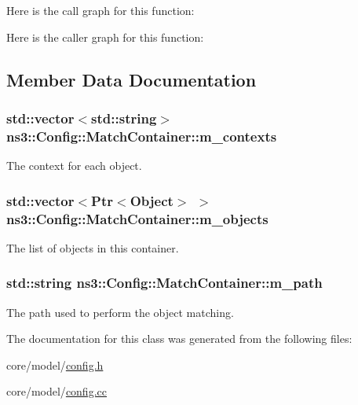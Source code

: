 Here is the call graph for this function\+:




Here is the caller graph for this function\+:




\subsection{Member Data Documentation}
\subsubsection[{\texorpdfstring{m\+\_\+contexts}{m_contexts}}]{\setlength{\rightskip}{0pt plus 5cm}std\+::vector$<$std\+::string$>$ ns3\+::\+Config\+::\+Match\+Container\+::m\+\_\+contexts\hspace{0.3cm}{\ttfamily [private]}}\hypertarget{classns3_1_1Config_1_1MatchContainer_afdcb16d3c587db9e4d6765e41221b3c2}{}\label{classns3_1_1Config_1_1MatchContainer_afdcb16d3c587db9e4d6765e41221b3c2}
The context for each object. 
\subsubsection[{\texorpdfstring{m\+\_\+objects}{m_objects}}]{\setlength{\rightskip}{0pt plus 5cm}std\+::vector$<${\bf Ptr}$<${\bf Object}$>$ $>$ ns3\+::\+Config\+::\+Match\+Container\+::m\+\_\+objects\hspace{0.3cm}{\ttfamily [private]}}\hypertarget{classns3_1_1Config_1_1MatchContainer_aeb80622a6ac767130a2ef3b27419beee}{}\label{classns3_1_1Config_1_1MatchContainer_aeb80622a6ac767130a2ef3b27419beee}
The list of objects in this container. 
\subsubsection[{\texorpdfstring{m\+\_\+path}{m_path}}]{\setlength{\rightskip}{0pt plus 5cm}std\+::string ns3\+::\+Config\+::\+Match\+Container\+::m\+\_\+path\hspace{0.3cm}{\ttfamily [private]}}\hypertarget{classns3_1_1Config_1_1MatchContainer_aa9fbedce767ff9ac6fb590175b0cc445}{}\label{classns3_1_1Config_1_1MatchContainer_aa9fbedce767ff9ac6fb590175b0cc445}
The path used to perform the object matching. 

The documentation for this class was generated from the following files\+:\begin{DoxyCompactItemize}
\item 
core/model/\hyperlink{config_8h}{config.\+h}\item 
core/model/\hyperlink{config_8cc}{config.\+cc}\end{DoxyCompactItemize}
